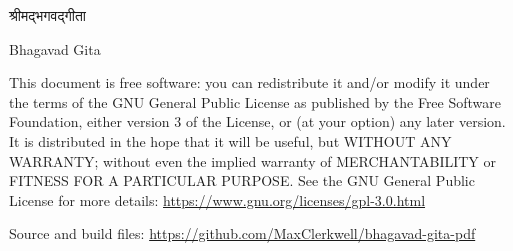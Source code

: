\thispagestyle{empty}
\vspace*{40mm}
\begin{center}
  {\sanskrit\LARGE श्रीमद्भगवद्गीता\par}
  \vspace{3mm}
  {\LARGE Bhagavad Gita\par}
\end{center}
\vfill
{\small\color{muted}\RaggedRight
This document is free software: you can redistribute it and/or modify it under
the terms of the GNU General Public License as published by the Free Software
Foundation, either version 3 of the License, or (at your option) any later
version. It is distributed in the hope that it will be useful, but WITHOUT ANY
WARRANTY; without even the implied warranty of MERCHANTABILITY or FITNESS FOR A
PARTICULAR PURPOSE. See the GNU General Public License for more details:
\url{https://www.gnu.org/licenses/gpl-3.0.html}\par
\vspace{2mm}
Source and build files: \url{https://github.com/MaxClerkwell/bhagavad-gita-pdf}\par}
\clearpage

